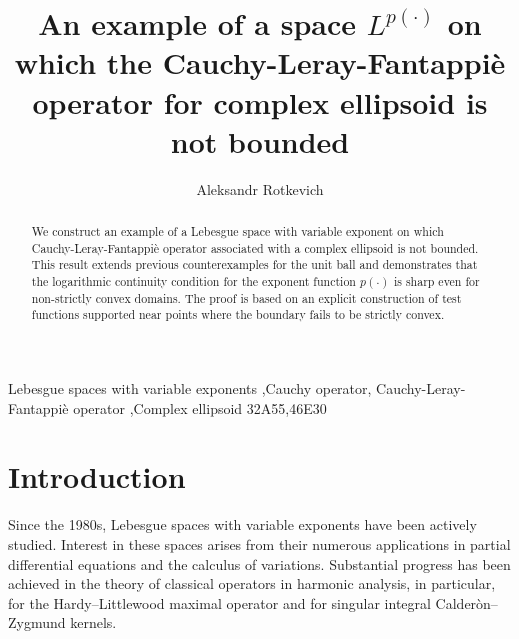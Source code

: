 \documentclass[review]{elsarticle}
\begin{document}
\begin{frontmatter}

\title{An example of a space $L^{p(\cdot)}$ on which the Cauchy-Leray-Fantappi\`{e} operator for complex ellipsoid is not bounded}

\author[mymainaddress]{Aleksandr Rotkevich}
\address[mymainaddress]{Department of Mathematical analysis, Mathematics and Mechanics Faculty, St. Petersburg  University, 198504,  Universitetsky prospekt, 28, Peterhof, St. Petersburg, Russia\\
Department of Mathematics and Computer Science, St. Petersburg University,	Russia, 14 line of the VO, 29B, 199178 St. Petersburg, Russia
}



\begin{abstract}
We construct an example of a Lebesgue space with variable exponent on which Cauchy-Leray-Fantappi\`{e} operator associated with a complex ellipsoid is not bounded. This result extends previous counterexamples for the unit ball and demonstrates that the logarithmic continuity condition for the exponent function $p(\cdot)$ is sharp even for non-strictly convex domains. The proof is based on an explicit construction of test functions supported near points where the boundary fails to be strictly convex. 
\end{abstract}

\begin{keyword}
 Lebesgue spaces with variable exponents \sep Cauchy operator\sep
 Cauchy-Leray-Fantappi\`{e} operator \sep Complex ellipsoid
\MSC[2010] 32A55\sep 46E30
\end{keyword}

\end{frontmatter}


\section{Introduction}

Since the 1980s, Lebesgue spaces with variable exponents have been actively studied. Interest in these spaces arises from their numerous applications in partial differential equations and the calculus of variations. Substantial progress has been achieved in the theory of classical operators in harmonic analysis, in particular, for the Hardy–Littlewood maximal operator and for singular integral Calder\`{o}n--Zygmund kernels.
\end{document}
